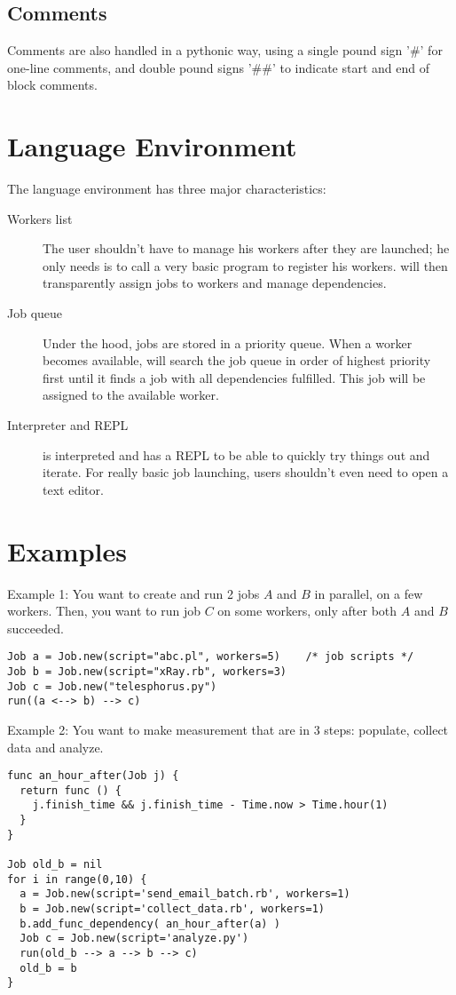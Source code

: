 \subsection*{Comments}
Comments are also handled in a pythonic way, using a single pound sign '\#' for
one-line comments, and double pound signs '\#\#' to indicate start and end of block comments.

%

\section{Language Environment}
\label{sect:tech}
The language environment has three major characteristics:
\begin{description}
\item[Workers list] The user shouldn't have to manage his workers after
they are launched; he only needs is to call a very basic program
to register his workers. \lang{} will then transparently assign jobs to workers
and manage dependencies.
\item[Job queue] Under the hood, jobs are stored in a priority queue. When a
worker becomes available, \lang{} will search the job queue in order of highest
priority first until it finds a job with all dependencies fulfilled. This job
will be assigned to the available worker.
\item[Interpreter and REPL] \lang{} is interpreted and has a REPL to be able to
quickly try things out and iterate. For really basic job launching, users shouldn't
even need to open a text editor.
\end{description}

\section{Examples}
\label{sect:ex}
Example 1: You want to create and run 2 jobs $A$ and $B$ in parallel, on a few
workers. Then, you want to run job $C$ on some workers, only after both $A$
and $B$ succeeded.
\begin{lstlisting}
Job a = Job.new(script="abc.pl", workers=5)    /* job scripts */
Job b = Job.new(script="xRay.rb", workers=3)
Job c = Job.new("telesphorus.py")
run((a <--> b) --> c)
\end{lstlisting}
Example 2: You want to make measurement that are in 3 steps: populate, collect
data and analyze.
\begin{lstlisting}
func an_hour_after(Job j) {
  return func () {
    j.finish_time && j.finish_time - Time.now > Time.hour(1)
  }
}

Job old_b = nil
for i in range(0,10) {
  a = Job.new(script='send_email_batch.rb', workers=1)
  b = Job.new(script='collect_data.rb', workers=1)
  b.add_func_dependency( an_hour_after(a) )
  Job c = Job.new(script='analyze.py')
  run(old_b --> a --> b --> c)
  old_b = b
}
\end{lstlisting}

